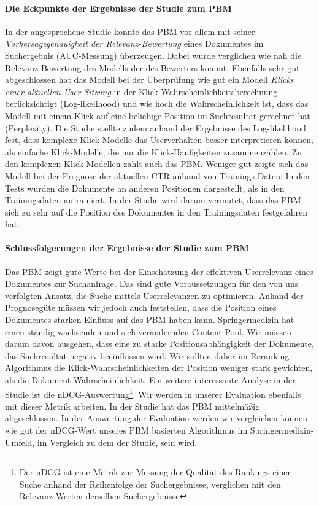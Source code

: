 \paragraph{Die Eckpunkte der Ergebnisse der Studie zum PBM}
In der angesprochene Studie \cite{pbm} konnte das PBM vor allem mit seiner \textit{Vorhersagegenauigkeit der Relevanz-Bewertung} eines Dokumentes im Suchergebnis (AUC-Messung) überzeugen. Dabei wurde verglichen wie nah die Relevanz-Bewertung des Modells der des Bewerters kommt. Ebenfalls sehr gut abgeschlossen hat das Modell bei der Überprüfung wie gut ein Modell \textit{Klicks einer aktuellen User-Sitzung} in der Klick-Wahrscheinlichkeitsberechnung berücksichtigt (Log-likelihood) und wie hoch die Wahrscheinlichkeit ist, dass das Modell mit einem Klick auf eine beliebige Position im Suchresultat gerechnet hat (Perplexity). Die Studie stellte zudem anhand der Ergebnisse des Log-likelihood fest, dass komplexe Klick-Modelle das Userverhalten besser interpretieren können, als einfache Klick-Modelle, die nur die Klick-Häufigkeiten zusammenzählen. Zu den komplexen Klick-Modellen zählt auch das PBM. Weniger gut zeigte sich das Modell bei der Prognose der aktuellen CTR anhand von Trainings-Daten. In den Tests wurden die Dokumente an anderen Positionen dargestellt, als in den Trainingsdaten antrainiert. In der Studie wird darum vermutet, dass das PBM sich zu sehr auf die Position des Dokumentes in den Trainingsdaten festgefahren hat.

\paragraph{Schlussfolgerungen der Ergebnisse der Studie zum PBM}
Das PBM zeigt gute Werte bei der Einschätzung der effektiven Userrelevanz eines Dokumentes zur Suchanfrage. Das sind gute Voraussetzungen für den von uns verfolgten Ansatz, die Suche mittels Userrelevanzen zu optimieren. Anhand der Prognosegüte müssen wir jedoch auch feststellen, dass die Position eines Dokumentes starken Einfluss auf das PBM haben kann. Springermedizin hat einen ständig wachsenden und sich verändernden Content-Pool. Wir müssen darum davon ausgehen, dass eine zu starke Positionsabhängigkeit der Dokumente, das Suchresultat negativ beeinflussen wird. Wir sollten daher im Reranking-Algorithmus die Klick-Wahrscheinlichkeiten der Position weniger stark gewichten, als die Dokument-Wahrscheinlichkeit. Ein weitere interessante Analyse in der Studie ist die nDCG-Auswertung\footnote{Der nDCG ist eine Metrik zur Messung der Qualität des Rankings einer Suche anhand der Reihenfolge der Suchergebnisse, verglichen mit den Relevanz-Werten derselben Suchergebnisse}. Wir werden in unserer Evaluation ebenfalls mit dieser Metrik arbeiten. In der Studie hat das PBM mittelmäßig abgeschlossen. In der Auswertung der Evaluation werden wir vergleichen können wie gut der nDCG-Wert unseres PBM basierten Algorithmus im Springermedizin-Umfeld, im Vergleich zu dem der Studie, sein wird.

